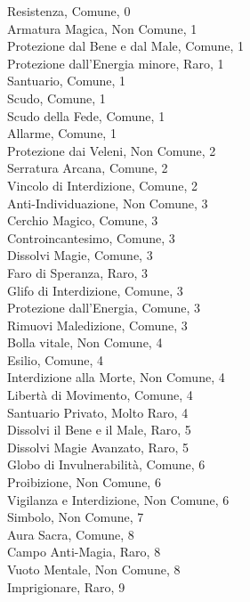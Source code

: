 \begin{multicols}{3}

Resistenza, Comune, 0\\
Armatura Magica, Non Comune, 1\\
Protezione dal Bene e dal Male, Comune, 1\\
Protezione dall'Energia minore, Raro, 1\\
Santuario, Comune, 1\\
Scudo, Comune, 1\\
Scudo della Fede, Comune, 1\\
Allarme, Comune, 1\\
Protezione dai Veleni, Non Comune, 2\\
Serratura Arcana, Comune, 2\\
Vincolo di Interdizione, Comune, 2\\
Anti-Individuazione, Non Comune, 3\\
Cerchio Magico, Comune, 3\\
Controincantesimo, Comune, 3\\
Dissolvi Magie, Comune, 3\\
Faro di Speranza, Raro, 3\\
Glifo di Interdizione, Comune, 3\\
Protezione dall'Energia, Comune, 3\\
Rimuovi Maledizione, Comune, 3\\
Bolla vitale, Non Comune, 4\\
Esilio, Comune, 4\\
Interdizione alla Morte, Non Comune, 4\\
Libertà di Movimento, Comune, 4\\
Santuario Privato, Molto Raro, 4\\
Dissolvi il Bene e il Male, Raro, 5\\
Dissolvi Magie Avanzato, Raro, 5\\
Globo di Invulnerabilità, Comune, 6\\
Proibizione, Non Comune, 6\\
Vigilanza e Interdizione, Non Comune, 6\\
Simbolo, Non Comune, 7\\
Aura Sacra, Comune, 8\\
Campo Anti-Magia, Raro, 8\\
Vuoto Mentale, Non Comune, 8\\
Imprigionare, Raro, 9\\



\end{multicols}
